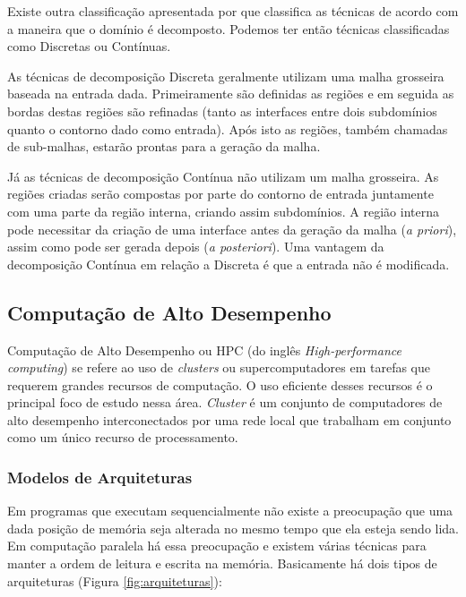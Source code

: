 Existe outra classificação apresentada por \cite{bib:Survey_Chrisochoides05} que classifica as técnicas de acordo com a maneira que o domínio é decomposto. Podemos ter então técnicas classificadas como Discretas ou Contínuas. 

As técnicas de decomposição Discreta geralmente utilizam uma malha grosseira baseada na entrada dada. Primeiramente são definidas as regiões e em seguida as bordas destas regiões são refinadas (tanto as interfaces entre dois subdomínios quanto o contorno dado como entrada). Após isto as regiões, também chamadas de sub-malhas,  estarão prontas para a geração da malha.

Já as técnicas de decomposição Contínua não utilizam um malha grosseira. As regiões criadas serão compostas por parte do contorno de entrada juntamente com uma parte da região interna, criando assim subdomínios. A região interna pode necessitar da criação de uma interface antes da geração da malha (\textit{a priori}), assim como pode ser gerada depois (\textit{a posteriori}). Uma vantagem da decomposição Contínua em relação a Discreta é que a entrada não é modificada.

\subsection{Computação de Alto Desempenho}\label{Computação de alto desempenho}

Computação de Alto Desempenho ou HPC (do inglês \textit{High-performance computing}) se refere ao uso de \textit{clusters} ou supercomputadores em tarefas que requerem grandes recursos de computação. O uso eficiente desses recursos é o principal foco de estudo nessa área. \textit{Cluster} é um conjunto de computadores de alto desempenho interconectados por uma rede local que trabalham em conjunto como um único recurso de processamento.

\subsubsection{Modelos de Arquiteturas}

Em programas que executam sequencialmente não existe a preocupação que uma dada posição de memória seja alterada no mesmo tempo que ela esteja sendo lida. Em computação paralela há essa preocupação e existem várias técnicas para manter a ordem de leitura e escrita na memória. Basicamente há dois tipos de arquiteturas (Figura \ref{fig:arquiteturas}):

